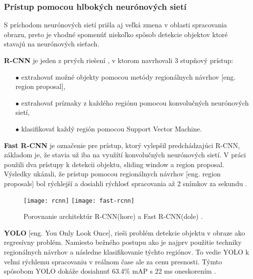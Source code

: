 \subsubsection{Prístup pomocou hlbokých neurónových sietí}
S príchodom neurónových sietí prišla aj veľká zmena v oblasti spracovania obrazu, preto je vhodné spomenúť niekoľko spôsob
    detekcie objektov ktoré stavajú na neurónových sieťach.

\textbf{R-CNN} je jeden z prvých riešení \cite{prop:rcnn}, v ktorom navrhovali 3 stupňový prístup:
\begin{enumerate}
	\item[$\bullet$] extrahovať možné objekty pomocou metódy regionálnych návrhov [eng. region proposal],
    \item[$\bullet$] extrahovať príznaky z každého regiónu pomocou konvolučných neurónových sietí,
    \item[$\bullet$] klasifikovať každý región pomocou Support Vector Machine.
\end{enumerate}

\textbf{Fast R-CNN} je označenie pre prístup, ktorý vylepšil predchádzajúci R-CNN, základom je, že stavia už iba na využítí konvolučných neurónových sietí.
V práci použili dva prístupy k detekcii objektu, sliding window a region proposal.
Výsledky ukázali, že prístup pomocou regionálnych návrhov [eng. region proposals] bol rýchlejší a dosiahli rýchlosť spracovania až 2 snímkov za sekundu \cite{prop:fast-rcnn}.
\begin{figure}[H]
    \centering
    \texttt{[image: rcnn]}
    \qquad
    \texttt{[image: fast-rcnn]}
    \caption{Porovnanie architektúr R-CNN(hore) a Fast R-CNN(dole) \cite{odkaz:ObjectDetectionOverview}.}
    \label{pic:FastRCNN}
\end{figure}

\textbf{YOLO} [eng. You Only Look Once], rieši problém detekcie objektu v obraze ako regresívny problém.
Namiesto bežného postupu ako je najprv použitie techniky regionálnych návrhov a následne klasifikovanie týchto regiónov.
To vedie YOLO k veľmi rýchlemu spracovaniu v reálnom čase ale za cenu presnosti.
Týmto spôsobom YOLO dokáže dosiahnuť 63.4\% mAP s 22 ms oneskorením \cite{prop:Redmon2016YouOL}.

